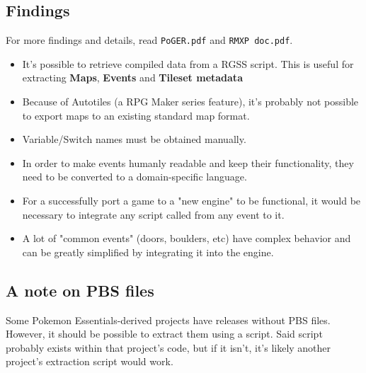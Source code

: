 \documentclass[11pt]{article}
\begin{document}
\subsection{Findings}

For more findings and details, read \verb|PoGER.pdf| and \verb|RMXP doc.pdf|.

\begin{itemize}
	\item It's possible to retrieve compiled data from a RGSS script. This is useful for extracting \textbf{Maps}, \textbf{Events} and \textbf{Tileset metadata}
	
	\item Because of Autotiles (a RPG Maker series feature), it's probably not possible to export maps to an existing standard map format.
	
	\item Variable/Switch names must be obtained manually.
	
	\item In order to make events humanly readable and keep their functionality, they need to be converted to a domain-specific language.
	
	\item For a successfully port a game to a "new engine" to be functional, it would be necessary to integrate any script called from any event to it.
	
	\item A lot of "common events" (doors, boulders, etc) have complex behavior and can be greatly simplified by integrating it into the engine.
\end{itemize}


\subsection{A note on PBS files}

Some Pokemon Essentials-derived projects have releases without PBS files. However, it should be possible to extract them using a script. Said script probably exists within that project's code, but if it isn't, it's likely another project's extraction script would work.





\newpage
\end{document}
